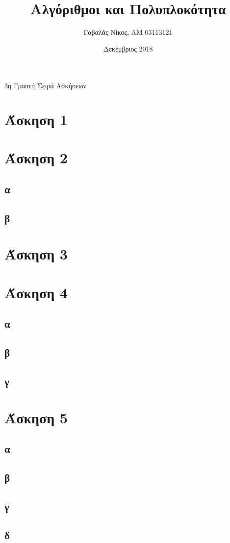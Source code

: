 \documentclass[12pt,a4paper]{article}
\title{Αλγόριθμοι και Πολυπλοκότητα}
\author{Γαβαλάς Νίκος, AM 03113121}
\date{Δεκέμβριος 2018}
\begin{document}
  \maketitle

  \begin{center}
    \Large{3η Γραπτή Σειρά Ασκήσεων}
  \end{center}

  \section{Άσκηση 1}

  \section{Άσκηση 2}

  \subsection{α}

  \subsection{β}

  \section{Άσκηση 3}
  
  \section{Άσκηση 4}

  \subsection{α}
  
  \subsection{β}

  \subsection{γ}

  \section{Άσκηση 5}

  \subsection{α}
  
  \subsection{β}
  
  \subsection{γ}

  \subsection{δ}
\end{document}
